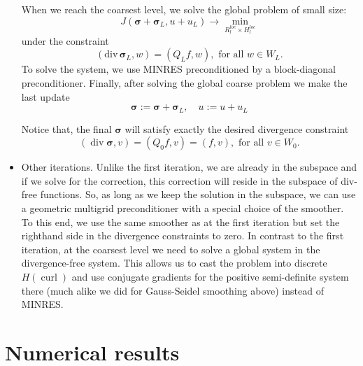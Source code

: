 \documentclass[a4paper,12pt]{amsart}
\numberwithin{equation}{section}
\newtheorem{remark}{Remark}[section]
\newcommand{\curl}{\operatorname{curl}}
\renewcommand{\div}{\operatorname{div}}
\def\bsigma{{\boldsymbol \sigma}}
\begin{document}
\begin{itemize}
	When we reach the coarsest level, we solve the global problem
of small size:
$$
J(\bsigma + \bsigma_L, u + u_L) \rightarrow \min_{R_l^{loc} \times H_l^{loc}}
$$
	under the constraint
$$
(\mathrm{div}\, \bsigma_L, w ) = (Q_L f, w), \text{ for all } w \in W_{L}. 
$$
    To solve the system, we use MINRES preconditioned by a block-diagonal preconditioner.
	Finally, after solving the global coarse problem we make the last update
$$
 \bsigma := \bsigma + \bsigma_L, \quad u := u + u_L
$$	
	
	Notice that, the final $\bsigma$ will satisfy exactly the desired divergence constraint
	$$
	(\div \bsigma, v) = (Q_0 f, v) = (f, v) , \text{ for all } v \in W_0. 
	$$
	
	\item Other iterations. Unlike the first iteration, we are already in the subspace and if we solve for the correction, this correction will reside in the subspace of div-free functions. So, as long as we keep the solution in the subspace, we can use a geometric multigrid preconditioner with a special choice of the smoother.
	To this end, we use the same smoother as at the first iteration but set the righthand side in the divergence constraints to zero.
	In contrast to the first iteration, at the coarsest level we need to solve a global system in the divergence-free system. This allows us to cast the problem into discrete $H(\curl)$ and use conjugate gradients for the positive semi-definite system there (much alike we did for Gauss-Seidel smoothing above) instead of MINRES.
	
\end{itemize}



\section{Numerical results}
\end{document}
